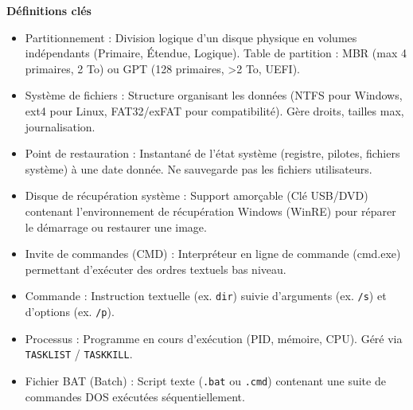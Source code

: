 \documentclass[11pt]{article}
\newcommand{\cle}[1]{{\popxbold\color{popdark}#1}}
\begin{document}
\begin{bilan}

\textbf{Définitions clés}\par
\begin{itemize}
    \item \cle{Partitionnement} : Division logique d'un disque physique en volumes indépendants (Primaire, Étendue, Logique). Table de partition : \cle{MBR} (max 4 primaires, 2 To) ou \cle{GPT} (128 primaires, >2 To, UEFI).
    \item \cle{Système de fichiers} : Structure organisant les données (NTFS pour Windows, ext4 pour Linux, FAT32/exFAT pour compatibilité). Gère droits, tailles max, journalisation.
    \item \cle{Point de restauration} : Instantané de l'état système (registre, pilotes, fichiers système) à une date donnée. Ne sauvegarde pas les fichiers utilisateurs.
    \item \cle{Disque de récupération système} : Support amorçable (Clé USB/DVD) contenant l'environnement de récupération Windows (WinRE) pour réparer le démarrage ou restaurer une image.
    \item \cle{Invite de commandes (CMD)} : Interpréteur en ligne de commande (cmd.exe) permettant d'exécuter des ordres textuels bas niveau.
    \item \cle{Commande} : Instruction textuelle (ex. \texttt{dir}) suivie d'arguments (ex. \texttt{/s}) et d'options (ex. \texttt{/p}).
    \item \cle{Processus} : Programme en cours d'exécution (PID, mémoire, CPU). Géré via \texttt{TASKLIST} / \texttt{TASKKILL}.
    \item \cle{Fichier BAT (Batch)} : Script texte (\texttt{.bat} ou \texttt{.cmd}) contenant une suite de commandes DOS exécutées séquentiellement.
\end{itemize}


\end{bilan}
\end{document}
